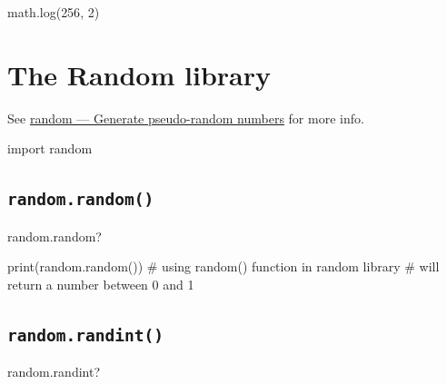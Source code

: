 \documentclass[
  letterpaper,
  DIV=11,
  numbers=noendperiod]{scrreprt}
\newenvironment{Shaded}{\begin{snugshade}}{\end{snugshade}}
\newcommand{\BuiltInTok}[1]{\textcolor[rgb]{0.00,0.23,0.31}{#1}}
\newcommand{\CommentTok}[1]{\textcolor[rgb]{0.37,0.37,0.37}{#1}}
\newcommand{\DecValTok}[1]{\textcolor[rgb]{0.68,0.00,0.00}{#1}}
\newcommand{\ImportTok}[1]{\textcolor[rgb]{0.00,0.46,0.62}{#1}}
\newcommand{\NormalTok}[1]{\textcolor[rgb]{0.00,0.23,0.31}{#1}}
\begin{document}
\begin{Shaded}
\begin{Highlighting}[]
\NormalTok{math.log(}\DecValTok{256}\NormalTok{, }\DecValTok{2}\NormalTok{)}
\end{Highlighting}
\end{Shaded}

\hypertarget{the-random-library}{%
\chapter{The Random library}\label{the-random-library}}

See \href{https://docs.python.org/3/library/random.html}{random ---
Generate pseudo-random numbers} for more info.

\begin{Shaded}
\begin{Highlighting}[]
\ImportTok{import}\NormalTok{ random}
\end{Highlighting}
\end{Shaded}

\hypertarget{random.random}{%
\section{\texorpdfstring{\texttt{random.random()}}{random.random()}}\label{random.random}}

\begin{Shaded}
\begin{Highlighting}[]
\NormalTok{random.random?}
\end{Highlighting}
\end{Shaded}

\begin{Shaded}
\begin{Highlighting}[]
\BuiltInTok{print}\NormalTok{(random.random()) }\CommentTok{\# using random() function in random library}
    \CommentTok{\# will return a number between 0 and 1}
\end{Highlighting}
\end{Shaded}

\hypertarget{random.randint}{%
\section{\texorpdfstring{\texttt{random.randint()}}{random.randint()}}\label{random.randint}}

\begin{Shaded}
\begin{Highlighting}[]
\NormalTok{random.randint?}
\end{Highlighting}
\end{Shaded}
\end{document}
